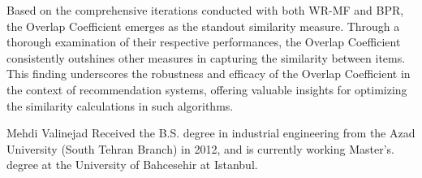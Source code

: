 \documentclass[journal]{IEEEtran}
\begin{document}
Based on the comprehensive iterations conducted with both WR-MF and BPR, the Overlap Coefficient emerges as the standout similarity 
measure. Through a thorough examination of their respective performances, the Overlap Coefficient consistently outshines other measures 
in capturing the similarity between items. This finding underscores the robustness and efficacy of the Overlap Coefficient in the 
context of recommendation systems, offering valuable insights for optimizing the similarity calculations in such algorithms.

\ifCLASSOPTIONcaptionsoff
  \newpage
\fi




\begin{IEEEbiographynophoto}{Mehdi Valinejad}
Received the B.S. degree in industrial engineering from the Azad University (South Tehran Branch) in 2012, and is currently working Master's. degree at the University of Bahcesehir at Istanbul.
\end{IEEEbiographynophoto}
\end{document}
